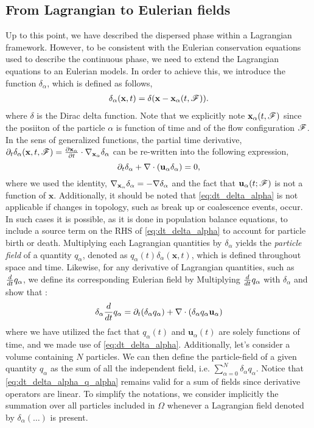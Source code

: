 
\subsection{From Lagrangian to Eulerian fields}

Up to this point, we have described the dispersed phase within a Lagrangian framework.
However, to be consistent with the Eulerian conservation equations used to describe the continuous phase, we need to extend the Lagrangian equations to an Eulerian models. 
In order to achieve this, we introduce the function $\delta_\alpha$, which is defined as follows, 
\begin{align}
    \delta_\alpha(\textbf{x},t) = \delta(\textbf{x}-\textbf{x}_\alpha(t,\mathscr{F})).
    \label{eq:delta_alpha}
\end{align}
where $\delta$ is the Dirac delta function.
Note that we explicitly note $\textbf{x}_\alpha(t,\mathscr{F})$ since the posiiton of the particle $\alpha$ is function of time and of the flow configuration $\mathscr{F}$.
In the sens of generalized functions, the partial time derivative, $\partial_t \delta_\alpha(\textbf{x},t,\mathscr{F}) =  \frac{\partial \textbf{x}_\alpha}{\partial t} \cdot \mathbf{\nabla}_{\textbf{x}_\alpha} \delta_\alpha$ can be re-written into the following expression, 
\begin{equation}
    \partial_t \delta_\alpha
    + \mathbf{\nabla}\cdot (\textbf{u}_\alpha  \delta_\alpha)
    =0,
    \label{eq:dt_delta_alpha}
\end{equation}
where we used the identity, $\mathbf{\nabla}_{\textbf{x}_\alpha} \delta_\alpha = -\mathbf{\nabla} \delta_\alpha$ and the fact that $\textbf{u}_\alpha(t;\mathscr{F})$ is not a function of $\textbf{x}$. 
Additionally, it should be noted that \ref{eq:dt_delta_alpha} is not applicable if changes in topology, such as break up or coalescence events, occur.
In such cases it is possible, as it is done in population balance equations, to include a source term on the RHS of \ref{eq:dt_delta_alpha} to account for particle birth or death. 
Multiplying each Lagrangian quantities by $\delta_\alpha$ yields the \textit{particle field} of a quantity $q_\alpha$, denoted as $q_\alpha(t)\delta_\alpha(\textbf{x},t)$, which is defined throughout space and time.
Likewise, for any derivative of Lagrangian quantities, such as $\frac{d}{d t} q_\alpha$, we define its corresponding Eulerian field by Multiplying $\frac{d}{d t} q_\alpha$ with $\delta_\alpha$ and show that :
\begin{equation}
    \delta_\alpha \frac{d}{d t} q_\alpha
    = \partial_t (\delta_\alpha q_\alpha)
    + \mathbf{\nabla}\cdot (\delta_\alpha q_\alpha \textbf{u}_\alpha)
    \label{eq:dt_delta_alpha_q_alpha}
\end{equation}
where we have utilized the fact that $q_\alpha(t)$ and $\textbf{u}_\alpha(t)$ are solely functions of time, and we made use of \ref{eq:dt_delta_alpha}.
Additionally, let's consider a volume containing $N$ particles.
We can then define the particle-field of a given quantity $q_\alpha$ as the sum of all the independent field, i.e. $\sum_{\alpha=0}^N \delta_\alpha q_\alpha$.
Notice that \ref{eq:dt_delta_alpha_q_alpha} remains valid for a sum of fields since derivative operators are linear.
To simplify the notations, we consider implicitly the summation over all particles included in $\Omega$ whenever a Lagrangian field denoted by $\delta_\alpha (\ldots)$ is present.


